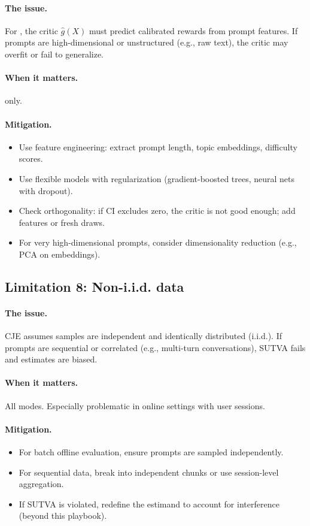 \paragraph{The issue.} For \dr, the critic $\hat{g}(X)$ must predict calibrated rewards from prompt features. If prompts are high-dimensional or unstructured (e.g., raw text), the critic may overfit or fail to generalize.

\paragraph{When it matters.} \dr{} only.

\paragraph{Mitigation.}
\begin{itemize}
\item Use feature engineering: extract prompt length, topic embeddings, difficulty scores.
\item Use flexible models with regularization (gradient-boosted trees, neural nets with dropout).
\item Check orthogonality: if CI excludes zero, the critic is not good enough; add features or fresh draws.
\item For very high-dimensional prompts, consider dimensionality reduction (e.g., PCA on embeddings).
\end{itemize}

\subsection{Limitation 8: Non-i.i.d. data}

\paragraph{The issue.} CJE assumes samples are independent and identically distributed (i.i.d.). If prompts are sequential or correlated (e.g., multi-turn conversations), SUTVA fails and estimates are biased.

\paragraph{When it matters.} All modes. Especially problematic in online settings with user sessions.

\paragraph{Mitigation.}
\begin{itemize}
\item For batch offline evaluation, ensure prompts are sampled independently.
\item For sequential data, break into independent chunks or use session-level aggregation.
\item If SUTVA is violated, redefine the estimand to account for interference (beyond this playbook).
\end{itemize}

